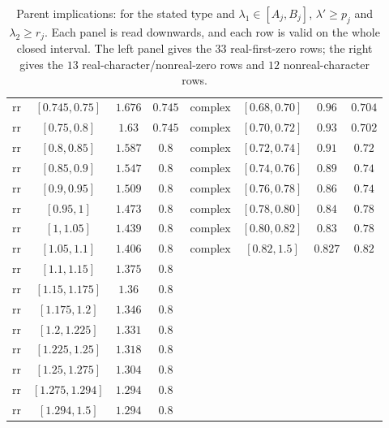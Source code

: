 \documentclass[11pt]{amsart}
\numberwithin{equation}{section}
\theoremstyle{plain}
\theoremstyle{definition}
\theoremstyle{remark}
\newcommand{\1}{\mathbf{1}}
\begin{document}
\begin{table}[tp]
\begin{tabular}{@{}lccc@{\qquad\qquad}lccc@{}}
$\mathrm{rr}$ & $[0.745,0.75]$ & $1.676$ & $0.745$ & $\mathrm{complex}$ & $[0.68,0.70]$ & $0.96$ & $0.704$ \\
$\mathrm{rr}$ & $[0.75,0.8]$ & $1.63$ & $0.745$ & $\mathrm{complex}$ & $[0.70,0.72]$ & $0.93$ & $0.702$ \\
$\mathrm{rr}$ & $[0.8,0.85]$ & $1.587$ & $0.8$ & $\mathrm{complex}$ & $[0.72,0.74]$ & $0.91$ & $0.72$ \\
$\mathrm{rr}$ & $[0.85,0.9]$ & $1.547$ & $0.8$ & $\mathrm{complex}$ & $[0.74,0.76]$ & $0.89$ & $0.74$ \\
$\mathrm{rr}$ & $[0.9,0.95]$ & $1.509$ & $0.8$ & $\mathrm{complex}$ & $[0.76,0.78]$ & $0.86$ & $0.74$ \\
$\mathrm{rr}$ & $[0.95,1]$ & $1.473$ & $0.8$ & $\mathrm{complex}$ & $[0.78,0.80]$ & $0.84$ & $0.78$ \\
$\mathrm{rr}$ & $[1,1.05]$ & $1.439$ & $0.8$ & $\mathrm{complex}$ & $[0.80,0.82]$ & $0.83$ & $0.78$ \\
$\mathrm{rr}$ & $[1.05,1.1]$ & $1.406$ & $0.8$ & $\mathrm{complex}$ & $[0.82,1.5]$ & $0.827$ & $0.82$ \\
$\mathrm{rr}$ & $[1.1,1.15]$ & $1.375$ & $0.8$ &  & & &  \\
$\mathrm{rr}$ & $[1.15,1.175]$ & $1.36$ & $0.8$ &  & & &  \\
$\mathrm{rr}$ & $[1.175,1.2]$ & $1.346$ & $0.8$ &  & & &  \\
$\mathrm{rr}$ & $[1.2,1.225]$ & $1.331$ & $0.8$ &  & & &  \\
$\mathrm{rr}$ & $[1.225,1.25]$ & $1.318$ & $0.8$ &  & & &  \\
$\mathrm{rr}$ & $[1.25,1.275]$ & $1.304$ & $0.8$ &  & & &  \\
$\mathrm{rr}$ & $[1.275,1.294]$ & $1.294$ & $0.8$ &  & & &  \\
$\mathrm{rr}$ & $[1.294,1.5]$ & $1.294$ & $0.8$ &  & & &  \\
\bottomrule
\end{tabular}
\caption{Parent implications: for the stated type and $\lambda_1\in[A_j,B_j]$,
$\lambda'\ge p_j$ and $\lambda_2\ge r_j$. Each panel is read downwards, and each row is
valid on the whole closed interval. The left panel gives the $33$ real-first-zero rows;
the right gives the $13$ real-character/nonreal-zero rows and $12$ nonreal-character rows.}
\label{tab:parents}
\end{table}
\end{document}
